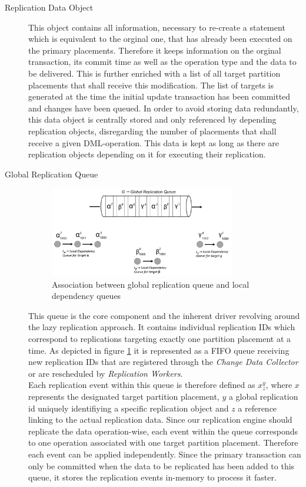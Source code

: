 \begin{description}

    \item[Replication Data Object] This object contains all information, necessary to re-create a statement which is equivalent to the orginal one,
    that has already been executed on the primary placements. 
    Therefore it keeps information on the orginal transaction, its commit time as well as the operation type and the data to be delivered. 
    This is further enriched with a list of all target partition placements that shall receive this modification. The list of targets is generated
    at the time the initial update transaction has been committed and changes have been queued. In order to avoid storing data redundantly, this data object 
    is centrally stored and only referenced by depending replication objects, disregarding the number of placements that shall receive a given DML-operation.
    This data is kept as long as there are replication objects depending on it for executing their replication.


    \item[Global Replication Queue] 
    
    \begin{figure}[t]
        \centering
        \includegraphics[width=0.8\textwidth]{Figures/Queue.png}
        \caption{Association between global replication queue and local dependency queues}
        \label{fig:queue}
    \end{figure}
  
    This queue is the core component and the inherent driver revolving around the lazy replication approach. 
    It contains individual replication IDs which correspond to replications targeting exactly one partition placement at a time.
    As depicted in figure \ref{fig:queue} it is represented as a FIFO queue receiving new replication IDs that are registered through the \emph{Change Data Collector} 
    or are rescheduled by \emph{Replication Workers}.\\
    Each replication event within this queue is therefore defined as $x_{z}^y$, where $x$ represents the designated target partition placement, $y$ a global
    replication id uniquely identifiying a specific replication object and $z$ a reference linking to the actual replication data. 
    Since our replication engine should replicate the data operation-wise, each event within the queue corresponds to one operation associated with one target partition placement.
    Therefore each event can be applied independently. Since the primary transaction can only be committed when the data to be replicated has been added to this queue,
    it stores the replication events in-memory to process it faster.


\end{description}
